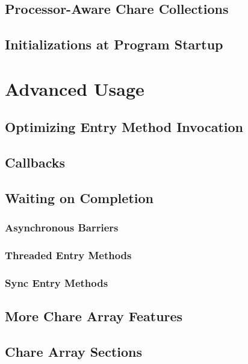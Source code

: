\documentclass[10pt]{report}
\begin{document}
\chapter{Processor-Aware Chare Collections}
  
  

\chapter{Initializations at Program Startup}
  

\part{Advanced Usage}

\chapter{Optimizing Entry Method Invocation}
  
  
  

\chapter{Callbacks}
  

\chapter{Waiting on Completion}
  \section{Asynchronous Barriers}
  \section{Threaded Entry Methods}
  \section{Sync Entry Methods}
  
  

\chapter{More Chare Array Features}
\label{advanced arrays}
  

\chapter{Chare Array Sections}
\label{array section}
  
\end{document}
